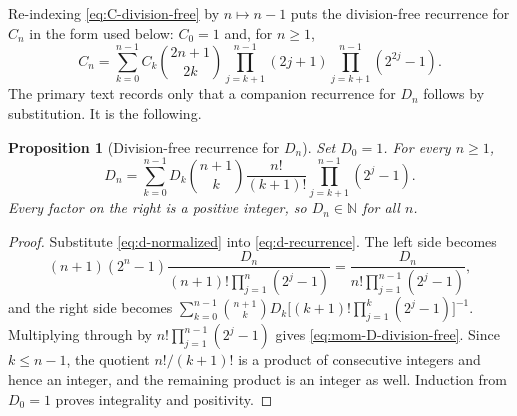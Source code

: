 \documentclass[11pt,oneside]{article}
\newtheorem{proposition}[theorem]{Proposition}
\theoremstyle{definition}
\theoremstyle{remark}
\newcommand{\N}{\mathbb N}
\begin{document}
Re-indexing \eqref{eq:C-division-free} by $n\mapsto n-1$ puts the division-free recurrence for
$C_n$ in the form used below: $C_0=1$ and, for $n\ge1$,
\begin{equation}
 C_n=\sum_{k=0}^{n-1}C_k\binom{2n+1}{2k}
 \prod_{j=k+1}^{n-1}(2j+1)
 \prod_{j=k+1}^{n-1}(2^{2j}-1).                            \label{eq:mom-C-division-free}
\end{equation}
The primary text records only that a companion recurrence for $D_n$ follows by substitution.
It is the following.

\begin{proposition}[Division-free recurrence for $D_n$]     \label{prop:mom-D-division-free}
Set $D_0=1$.  For every $n\ge1$,
\begin{equation}
 D_n=\sum_{k=0}^{n-1}D_k\binom{n+1}{k}\frac{n!}{(k+1)!}
 \prod_{j=k+1}^{n-1}(2^j-1).                               \label{eq:mom-D-division-free}
\end{equation}
Every factor on the right is a positive integer, so $D_n\in\N$ for all $n$.
\end{proposition}

\begin{proof}
Substitute \eqref{eq:d-normalized} into \eqref{eq:d-recurrence}.  The left side becomes
\begin{equation*}
 (n+1)(2^n-1)\frac{D_n}{(n+1)!\prod_{j=1}^{n}(2^j-1)}
 =\frac{D_n}{n!\prod_{j=1}^{n-1}(2^j-1)},
\end{equation*}
and the right side becomes
$\sum_{k=0}^{n-1}\binom{n+1}{k}D_k\bigl[(k+1)!\prod_{j=1}^{k}(2^j-1)\bigr]^{-1}$.
Multiplying through by $n!\prod_{j=1}^{n-1}(2^j-1)$ gives \eqref{eq:mom-D-division-free}.
Since $k\le n-1$, the quotient $n!/(k+1)!$ is a product of consecutive integers and hence an
integer, and the remaining product is an integer as well.  Induction from $D_0=1$ proves
integrality and positivity.
\end{proof}
\end{document}
